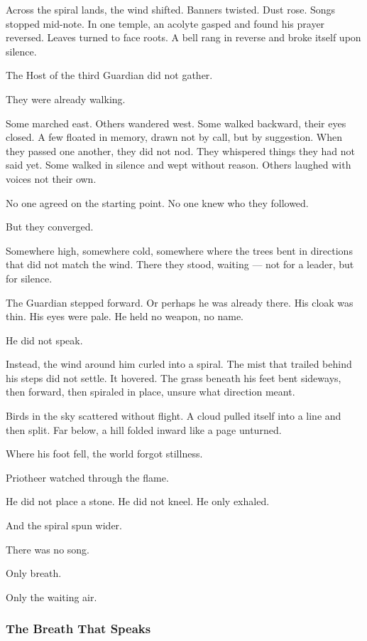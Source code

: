 \documentclass[12pt]{article}
\begin{document}
Across the spiral lands, the wind shifted. Banners twisted. Dust rose. Songs stopped mid-note. In one temple, an acolyte gasped and found his prayer reversed. Leaves turned to face roots. A bell rang in reverse and broke itself upon silence.

The Host of the third Guardian did not gather.

They were already walking.

Some marched east. Others wandered west. Some walked backward, their eyes closed. A few floated in memory, drawn not by call, but by suggestion. When they passed one another, they did not nod. They whispered things they had not said yet. Some walked in silence and wept without reason. Others laughed with voices not their own.

No one agreed on the starting point. No one knew who they followed.

But they converged.

Somewhere high, somewhere cold, somewhere where the trees bent in directions that did not match the wind. There they stood, waiting — not for a leader, but for silence.

The Guardian stepped forward. Or perhaps he was already there. His cloak was thin. His eyes were pale. He held no weapon, no name.

He did not speak.

Instead, the wind around him curled into a spiral. The mist that trailed behind his steps did not settle. It hovered. The grass beneath his feet bent sideways, then forward, then spiraled in place, unsure what direction meant.

Birds in the sky scattered without flight. A cloud pulled itself into a line and then split. Far below, a hill folded inward like a page unturned.

Where his foot fell, the world forgot stillness.

Priotheer watched through the flame.

He did not place a stone. He did not kneel. He only exhaled.

And the spiral spun wider.

There was no song.

Only breath.

Only the waiting air.

\dotfill

\subsubsection*{The Breath That Speaks}
\end{document}
